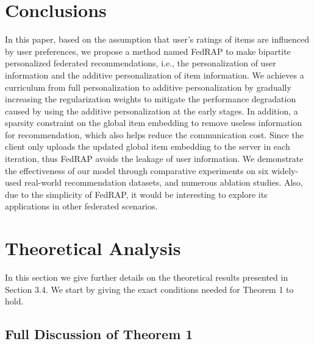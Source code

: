 \documentclass{article} %
\begin{document}
\section{Conclusions}
\label{sec:conclusion}

In this paper, based on the assumption that user's ratings of items are influenced by user preferences, we propose a method named FedRAP to make bipartite personalized federated recommendations, i.e., the personalization of user information and the additive personalization of item information. 
We achieves a curriculum from full personalization to additive personalization by gradually increasing the regularization weights to mitigate the performance degradation caused by using the additive personalization at the early stages.
In addition, a sparsity constraint on the global item embedding to remove useless information for recommendation, which also helps reduce the communication cost.
Since the client only uploads the updated global item embedding to the server in each iteration, thus FedRAP avoids the leakage of user information.
We demonstrate the effectiveness of our model through comparative experiments on six widely-used real-world recommendation datasets, and numerous ablation studies.
Also, due to the simplicity of FedRAP, it would be interesting to explore its applications in other federated scenarios.






\appendix
\section{Theoretical Analysis}

In this section we give further details on the theoretical results presented in Section 3.4. We start by giving the exact conditions needed for Theorem 1 to hold.

\subsection{Full Discussion of Theorem 1}
\end{document}
